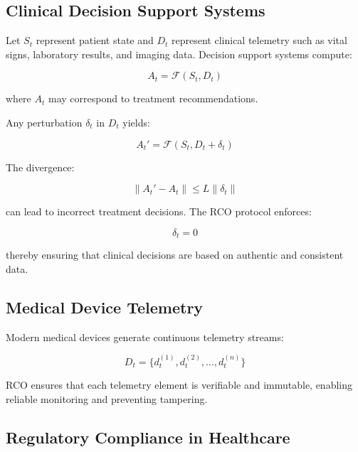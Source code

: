 \subsection{Clinical Decision Support Systems}

Let $S_t$ represent patient state and $D_t$ represent clinical telemetry such as vital signs, laboratory results, and imaging data. Decision support systems compute:

\begin{equation}
A_t = \mathcal{F}(S_t, D_t)
\end{equation}

where $A_t$ may correspond to treatment recommendations.

Any perturbation $\delta_t$ in $D_t$ yields:

\begin{equation}
A_t' = \mathcal{F}(S_t, D_t + \delta_t)
\end{equation}

The divergence:

\begin{equation}
\|A_t' - A_t\| \leq L \|\delta_t\|
\end{equation}

can lead to incorrect treatment decisions. The RCO protocol enforces:

\begin{equation}
\delta_t = 0
\end{equation}

thereby ensuring that clinical decisions are based on authentic and consistent data.

\subsection{Medical Device Telemetry}

Modern medical devices generate continuous telemetry streams:

\begin{equation}
D_t = \{d_t^{(1)}, d_t^{(2)}, \dots, d_t^{(n)}\}
\end{equation}

RCO ensures that each telemetry element is verifiable and immutable, enabling reliable monitoring and preventing tampering.

\subsection{Regulatory Compliance in Healthcare}

